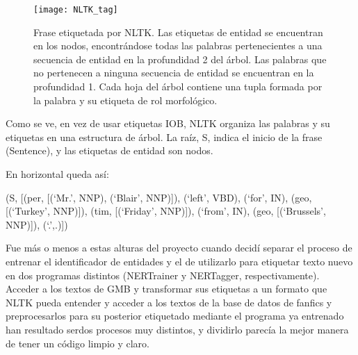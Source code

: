 \documentclass{pre-tfg}
\begin{document}
\begin{figure}[h]
	\texttt{[image: NLTK\_tag]}
	\caption{Frase etiquetada por NLTK. Las etiquetas de entidad se encuentran en los nodos, encontrándose todas las palabras pertenecientes a una secuencia de entidad en la profundidad 2 del árbol. Las palabras que no pertenecen a ninguna secuencia de entidad se encuentran en la profundidad 1. Cada hoja del árbol contiene una tupla formada por la palabra y su etiqueta de rol morfológico.}
	\label{fig:tags2}
	\centering
\end{figure}

Como se ve, en vez de usar etiquetas IOB, NLTK organiza las palabras y su etiquetas en una estructura de árbol. La raíz, S, indica el inicio de la frase (Sentence), y las etiquetas de entidad son nodos.

En horizontal queda así:

(S, [(per, [(‘Mr.’, NNP), (‘Blair’, NNP)]), (‘left’, VBD), (‘for’, IN), (geo, [(‘Turkey’, NNP)]), (tim, [(‘Friday’, NNP)]), (‘from’, IN), (geo, [(‘Brussels’, NNP)]), (‘.’,.)])

Fue más o menos a estas alturas del proyecto cuando decidí separar el proceso de entrenar el identificador de entidades y el de utilizarlo para etiquetar texto nuevo en dos programas distintos (NERTrainer y NERTagger, respectivamente). Acceder a los textos de GMB y transformar sus etiquetas a un formato que NLTK pueda entender y acceder a los textos de la base de datos de fanfics y preprocesarlos para su posterior etiquetado mediante el programa ya entrenado han resultado serdos procesos muy distintos, y dividirlo parecía la mejor manera de tener un código limpio y claro.

\end{document}
